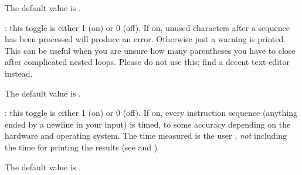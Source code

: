 The default value is .

: \label{se:def,strictmatch}this toggle is either 1 (on) or 0 (off). If on, unused characters after a
sequence has been
processed will produce an error. Otherwise just a warning is printed. This
can be useful when you are unsure how many parentheses you have to close
after complicated nested loops. Please do not use this; find a decent
text-editor instead.

The default value is .

: \label{se:def,timer}this toggle is either 1 (on) or 0 (off). If on, every instruction
sequence (anything ended by a
newline in your input) is timed, to some accuracy depending on the hardware
and operating system. The time measured is the user ,
\emph{not} including the time for printing the results (see \kbd{\#} and
\kbd{\#\#}).

The default value is .

\vfill\eject
